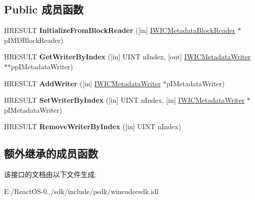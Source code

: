 \subsection*{Public 成员函数}
\begin{DoxyCompactItemize}
\item 
\mbox{\label{interface_i_w_i_c_metadata_block_writer_a1378523d007cc722a294de2e423c8596}} 
H\+R\+E\+S\+U\+LT {\bfseries Initialize\+From\+Block\+Reader} (\mbox{[}in\mbox{]} \hyperlink{interface_i_w_i_c_metadata_block_reader}{I\+W\+I\+C\+Metadata\+Block\+Reader} $\ast$p\+I\+M\+D\+Block\+Reader)
\item 
\mbox{\label{interface_i_w_i_c_metadata_block_writer_a6774955ea955813b96e3f13699b4eebd}} 
H\+R\+E\+S\+U\+LT {\bfseries Get\+Writer\+By\+Index} (\mbox{[}in\mbox{]} U\+I\+NT n\+Index, \mbox{[}out\mbox{]} \hyperlink{interface_i_w_i_c_metadata_writer}{I\+W\+I\+C\+Metadata\+Writer} $\ast$$\ast$pp\+I\+Metadata\+Writer)
\item 
\mbox{\label{interface_i_w_i_c_metadata_block_writer_a861e29a53494ba08d58078a657a2385f}} 
H\+R\+E\+S\+U\+LT {\bfseries Add\+Writer} (\mbox{[}in\mbox{]} \hyperlink{interface_i_w_i_c_metadata_writer}{I\+W\+I\+C\+Metadata\+Writer} $\ast$p\+I\+Metadata\+Writer)
\item 
\mbox{\label{interface_i_w_i_c_metadata_block_writer_a465c2164156f75c8fae24943043af486}} 
H\+R\+E\+S\+U\+LT {\bfseries Set\+Writer\+By\+Index} (\mbox{[}in\mbox{]} U\+I\+NT n\+Index, \mbox{[}in\mbox{]} \hyperlink{interface_i_w_i_c_metadata_writer}{I\+W\+I\+C\+Metadata\+Writer} $\ast$p\+I\+Metadata\+Writer)
\item 
\mbox{\label{interface_i_w_i_c_metadata_block_writer_a8ac3379bb73981943a9563adc94963bd}} 
H\+R\+E\+S\+U\+LT {\bfseries Remove\+Writer\+By\+Index} (\mbox{[}in\mbox{]} U\+I\+NT n\+Index)
\end{DoxyCompactItemize}
\subsection*{额外继承的成员函数}


该接口的文档由以下文件生成\+:\begin{DoxyCompactItemize}
\item 
E\+:/\+React\+O\+S-\/0../sdk/include/psdk/wincodecsdk.\+idl\end{DoxyCompactItemize}
